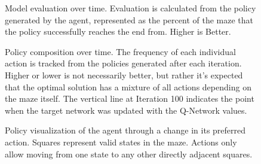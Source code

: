 \documentclass[12pt,letterpaper]{article}
\begin{document}
\begin{figure}[h]
	\begin{center}
		
	\end{center}
	\caption{Model evaluation over time. Evaluation is calculated from the policy generated by the agent, represented as the percent of the maze that the policy successfully reaches the end from. Higher is Better.}
	\label{fig:evaluation}
\end{figure}

\begin{figure}[h]
	\begin{center}
		
	\end{center}
	\caption{Policy composition over time. The frequency of each individual action is tracked from the policies generated after each iteration. Higher or lower is not necessarily better, but rather it's expected that the optimal solution has a mixture of all actions depending on the maze itself. The vertical line at Iteration 100 indicates the point when the target network was updated with the Q-Network values.}
	\label{fig:directional}
\end{figure}

\begin{figure}[h]
	\begin{center}
		\begin{subfigure}{0.4\linewidth}
			
			\label{fig:policy_350}
		\end{subfigure}
		\hspace{0.1in}
		\begin{subfigure}{0.4\linewidth}
			
			\label{fig:policy_400}
		\end{subfigure}
	\end{center}
	\begin{center}
		\begin{subfigure}{0.4\linewidth}
			
			\label{fig:policy_450}
		\end{subfigure}
		\hspace{0.1in}
		\begin{subfigure}{0.4\linewidth}
			
			\label{fig:policy_500}
		\end{subfigure}
	\end{center}
	\caption{Policy visualization of the agent through a change in its preferred action. Squares represent valid states in the maze. Actions only allow moving from one state to any other directly adjacent squares.}
	\label{fig:policy}
\end{figure}
\end{document}
